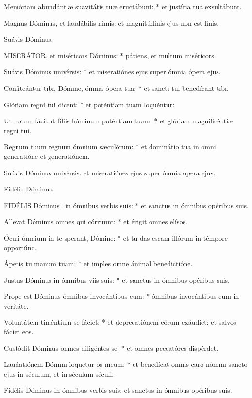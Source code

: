 Memóriam abundántiæ suavitátis tuæ eructábunt: * et justítia tua exsultábunt.

 Magnus Dóminus, et laudábilis nimis: et magnitúdinis ejus non est finis.

 Suávis Dóminus.


\lettrine[lines=2]{M}{ISERÁTOR}, et miséricors Dóminus: * pátiens, et multum miséricors.

Suávis Dóminus univérsis: * et miseratiónes ejus super ómnia ópera ejus.

Confiteántur tibi, Dómine, ómnia ópera tua: * et sancti tui benedícant tibi.

Glóriam regni tui dicent: * et poténtiam tuam loquéntur:

Ut notam fáciant fíliis hóminum poténtiam tuam: * et glóriam magnificéntiæ regni tui.

Regnum tuum regnum ómnium sæculórum: * et dominátio tua in omni generatióne et generatiónem.

 Suávis Dóminus univérsis: et miseratiónes ejus super ómnia ópera ejus.

 Fidélis Dóminus. \dag


\lettrine[lines=2]{F}{IDÉLIS} Dóminus \dag\ in ómnibus verbis suis: * et sanctus in ómnibus opéribus suis.

Allevat Dóminus omnes qui córruunt: * et érigit omnes elísos.

Óculi ómnium in te sperant, Dómine: * et tu das escam illórum in témpore opportúno.

Áperis tu manum tuam: * et imples omne ánimal benedictióne.

Justus Dóminus in ómnibus viis suis: * et sanctus in ómnibus opéribus suis.

Prope est Dóminus ómnibus invocántibus eum: * ómnibus invocántibus eum in veritáte.

Voluntátem timéntium se fáciet: * et deprecatiónem eórum exáudiet: et salvos fáciet eos.

Custódit Dóminus omnes diligéntes se: * et omnes peccatóres dispérdet.

Laudatiónem Dómini loquétur os meum: * et benedícat omnis caro nómini sancto ejus in séculum, et in séculum séculi.

 Fidélis Dóminus in ómnibus verbis suis: et sanctus in ómnibus opéribus suis.

